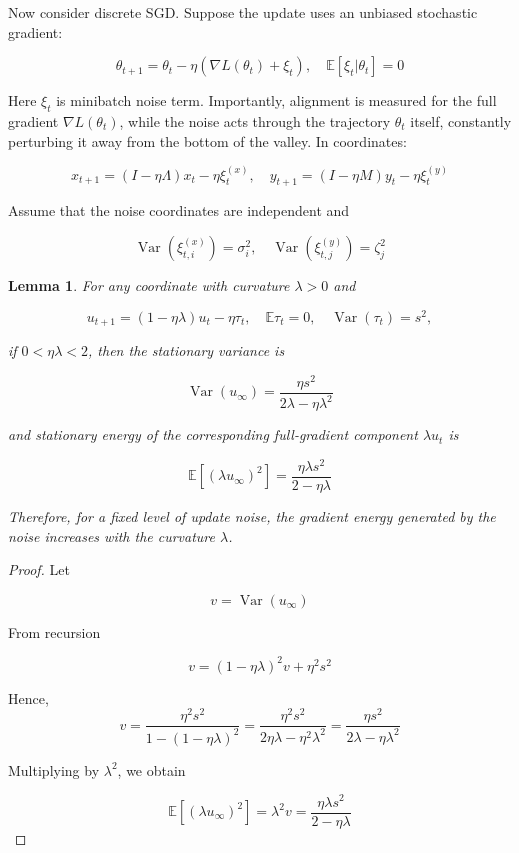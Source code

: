 \documentclass[conference]{IEEEtran}
\newtheorem{lemma}{Lemma}
\begin{document}
Now consider discrete SGD. Suppose the update uses an unbiased stochastic gradient:

\[
\theta_{t+1} = \theta_t - \eta(\nabla L(\theta_t) + \xi_t), \quad \mathbb{E}[\xi_t |\theta_t] = 0
\]

Here $\xi_t$ is minibatch noise term. Importantly, alignment is measured for the full gradient $\nabla L(\theta_t)$, while the noise acts through the trajectory $\theta_t$ itself, constantly perturbing it away from the bottom of the valley. In coordinates:

\[
x_{t+1} = (I-\eta\Lambda)x_t - \eta\xi_t^{(x)},\quad y_{t+1}=(I-\eta M)y_t-\eta\xi_t^{(y)}
\]

Assume that the noise coordinates are independent and

\[
\operatorname{Var}\left(\xi_{t,i}^{(x)}\right) = \sigma_i^2,\quad \operatorname{Var}\left(\xi_{t,j}^{(y)}\right) = \zeta_j^2
\]

\begin{lemma}

    For any coordinate with curvature $\lambda > 0$ and

    \[
    u_{t+1}=(1-\eta\lambda)u_t-\eta\tau_t,\quad \mathbb{E}\tau_t = 0,\quad \operatorname{Var}(\tau_t) = s^2,
    \]

    if $0 < \eta\lambda<2$, then the stationary variance is

    \[
    \operatorname{Var}(u_\infty) = \frac{\eta s^2}{2\lambda - \eta\lambda^2}
    \]

    and stationary energy of the corresponding full-gradient component $\lambda u_t$ is

    \[
    \mathbb{E}[(\lambda u_\infty)^2] = \frac{\eta \lambda s^2}{2-\eta\lambda}
    \]

    Therefore, for a fixed level of update noise, the gradient energy generated by the noise increases with the curvature $\lambda$.
    
\end{lemma}

\begin{proof}

    Let

    \[
    v = \operatorname{Var}(u_\infty)
    \]

    From recursion
    
    \[
    v = (1-\eta\lambda)^2v+\eta^2s^2
    \]

    Hence,
    \[
    v = \frac{\eta^2s^2}{1-(1-\eta\lambda)^2} = \frac{\eta^2s^2}{2\eta\lambda-\eta^2\lambda^2} = \frac{\eta s^2}{2\lambda-\eta\lambda^2}
    \]

    Multiplying by $\lambda^2$, we obtain
    
    \[
    \mathbb{E}[(\lambda u_\infty)^2] = \lambda^2 v = \frac{\eta \lambda s^2}{2-\eta\lambda}
    \]
    
\end{proof}
\end{document}
